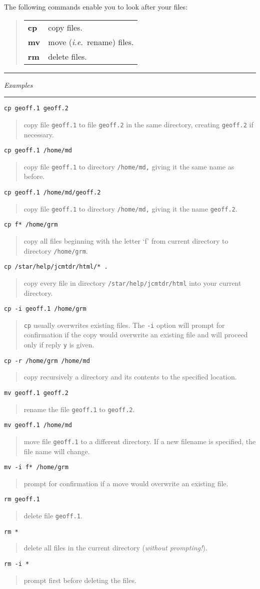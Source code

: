 \documentclass[twoside,11pt]{article}
\newcommand{\example}[2]{\goodbreak
                         {\tt #1}
                         \vspace*{-4mm}
                         \begin{quote}
                           {\small #2}
                         \end{quote}
                        }
\newcommand{\example}[2]{\goodbreak
                            {\tt #1}
                            \vspace*{-4mm}
                            \begin{quote}
                            {#2}
                            \end{quote}
                           }
\newcommand{\exbegin}{\begin{center}
                      \rule{18mm}{0.3mm}
                      {\em Examples}
                      \rule{18mm}{0.3mm}
                      \end{center}
                     }
\begin{document}
The following commands enable you to look after your files:

\begin{quote}
\begin{tabular}{lp{67mm}}

{\bf cp}  & copy files.\\
{\bf mv}  & move ({\em i.e.}\ rename) files.\\
{\bf rm}  & delete files.

\end{tabular}
\end{quote}

\exbegin

\example{cp geoff.1 geoff.2}
{copy file {\tt geoff.1} to file {\tt geoff.2} in the same directory, creating
{\tt geoff.2} if necessary.}

\example{cp geoff.1 /home/md}
{copy file {\tt geoff.1} to directory {\tt /home/md,} giving it the same name
as before.}

\example{cp geoff.1 /home/md/geoff.2}
{copy file {\tt geoff.1} to directory {\tt /home/md,} giving it the name
{\tt geoff.2}.}

\example{cp f* /home/grm}
{copy all files beginning with the letter `f' from current directory to
directory {\tt /home/grm}.}

\example{cp /star/help/jcmtdr/html/* .}
{copy every file in directory {\tt /star/help/jcmtdr/html} into your current
directory.}

\example{cp -i geoff.1 /home/grm}
{{\tt cp} usually overwrites existing files. The {\tt -i} option will prompt
for confirmation if the copy would overwrite an existing file and will proceed
only if reply {\tt y} is given.}

\example{cp -r /home/grm /home/md}
{copy recursively a directory and its contents to the specified location.}

\example{mv geoff.1 geoff.2}
{rename the file {\tt geoff.1} to {\tt geoff.2}.}

\example{mv geoff.1 /home/md}
{move file {\tt geoff.1} to a different directory.
If a new filename is specified, the file name will change.}

\example{mv -i f* /home/grm}
{prompt for confirmation if a move would overwrite an existing file.}

\example{rm geoff.1}
{delete file {\tt geoff.1}.}

\example{rm *}
{delete all files in the current directory ({\it without prompting!}).}

\example{rm -i *}
{prompt first before deleting the files.}
\end{document}
